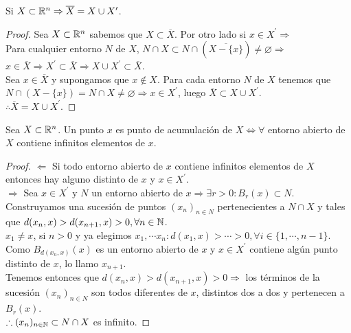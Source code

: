\begin{prop}
  Si \(X \subset \mathbb{R}^n \Rightarrow \overline{X} = X \cup X^{\prime}\).
  \begin{proof}
    Sea \(X \subset \mathbb{R}^n\) sabemos que \(X \subset \overline{X}\). Por otro lado si \(x \in X^{\prime} \Rightarrow\) \\
    Para cualquier entorno \(N\) de \(X\), \(N \cap X \subset N \cap (\overline{X - \{x\}}) \neq \varnothing \Rightarrow\) \\
    \(x \in \overline{X} \Rightarrow X^{\prime} \subset \overline{X} \Rightarrow X \cup X^{\prime} \subset \overline{X}\). \\

    Sea \(x \in \overline{X}\) y supongamos que \(x \notin X\). Para cada entorno \(N\) de \(X\) tenemos que \(N \cap (X - \{x\}) = N \cap X \neq \varnothing \Rightarrow x \in X^{\prime}\), luego \(\overline{X} \subset X \cup X^{\prime}\). \\
    \(\therefore \overline{X} = X \cup X^{\prime}\).
  \end{proof}
\end{prop}

\clearpage

\begin{prop}
  Sea \(X \subset \mathbb{R}^n\). Un punto \(x\) es punto de acumulación de \(X \iff \forall\) entorno abierto de \(X\) contiene infinitos elementos de \(x\).

  \begin{proof}
    \(\Leftarrow\) Si todo entorno abierto de \(x\) contiene infinitos elementos de \(X\) entonces hay alguno distinto de \(x\) y \(x \in X^{\prime}\). \\
    \(\Rightarrow\) Sea \(x \in X^{\prime}\) y \(N\) un entorno abierto de \(x \Rightarrow \exists r > 0 : B_r(x) \subset N\). \\
    Construyamos una sucesión de puntos \((x_n)_{n \in N}\) pertenecientes a \(N \cap X\) y tales que \(d(x_n, x) > d(x_{n+1}, x) > 0, \forall n \in \mathbb{N}\). \\
    \(x_1 \neq x\), si \(n > 0\) y ya elegimos \(x_1, \cdots x_n : d(x_1, x) > \cdots > 0, \forall i \in \{1, \cdots, n-1\}\). Como \(B_{d(x_n, x)}(x)\) es un entorno abierto de \(x\) y \(x \in X^{\prime}\) contiene algún punto distinto de \(x\), lo llamo \(x_{n+1}\). \\
    Tenemos entonces que \(d(x_n, x) > d(x_{n+1}, x) > 0 \Rightarrow\) los términos de la sucesión \((x_n)_{n \in N}\) son todos diferentes de \(x\), distintos dos a dos y pertenecen a \(B_r(x)\). \\
    \(\therefore (x_n)_{n \in \mathbb{N}} \subset N \cap X\) es infinito.
  \end{proof}
\end{prop}

